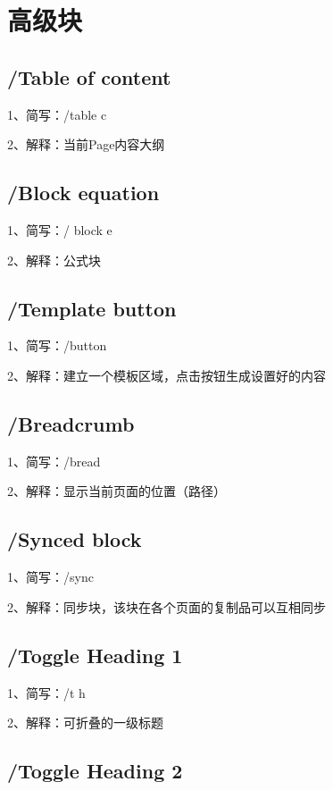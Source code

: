 \chapter{高级块}

\section{/Table of content}

1、简写：/table c

2、解释：当前Page内容大纲

\section{/Block equation}

1、简写：/ block e

2、解释：公式块

\section{/Template button}

1、简写：/button

2、解释：建立一个模板区域，点击按钮生成设置好的内容

\section{/Breadcrumb}

1、简写：/bread

2、解释：显示当前页面的位置（路径）

\section{/Synced block}

1、简写：/sync

2、解释：同步块，该块在各个页面的复制品可以互相同步

\section{/Toggle Heading 1}

1、简写：/t h

2、解释：可折叠的一级标题

\section{/Toggle Heading 2}

